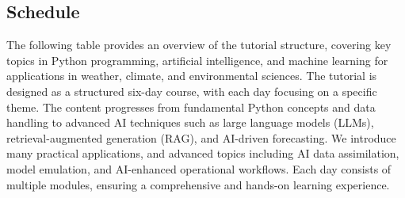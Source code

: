 \subsection{Schedule}
\noindent The following table provides an overview of the tutorial structure, covering key topics in Python programming, artificial intelligence, and machine learning for applications in weather, climate, and environmental sciences. The tutorial is designed as a structured six-day course, with each day focusing on a specific theme. The content progresses from fundamental Python concepts and data handling to advanced AI techniques such as large language models (LLMs), retrieval-augmented generation (RAG), and AI-driven forecasting. We introduce many practical applications, and advanced topics including AI data assimilation, model emulation, and AI-enhanced operational workflows. Each day consists of multiple modules, ensuring a comprehensive and hands-on learning experience.

